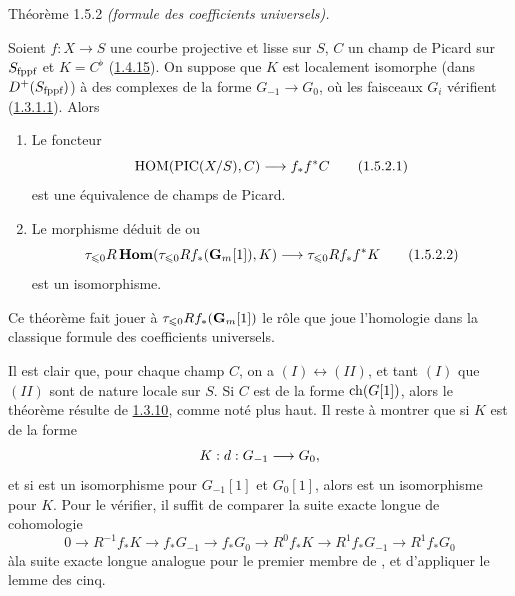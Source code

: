 \documentclass[10pt]{../fichiers-configuration-latex/smfart}
\begin{document}
\begin{enonce*}{Théorème 1.5.2}
\emph{(formule des coefficients universels).}

Soient $f:X\rightarrow S$ une courbe projective et lisse sur $S$, $C$
un champ de Picard sur $S_{\text{\rm fppf}}$ et $K=C^{\flat}$
(\hyperref[XVIII.prop1.4.15]{1.4.15}). On suppose que $K$ est localement isomorphe (dans
$D^{+}(S_{\text{\rm fppf}})$) à des complexes de la forme
$G_{-1}\rightarrow G_{0}$, où les faisceaux $G_{i}$ vérifient
(\hyperref[XVIII.par1.3.1.1]{1.3.1.1}). Alors
\begin{enumerate}
\renewcommand{\theenumi}{\Roman{enumi}}
\renewcommand{\labelenumi}{(\theenumi)}
\item Le foncteur 
\begin{equation*}
\operatorname{HOM}(\operatorname{PIC}(X/S),C)\longrightarrow f_{\ast}f^{\ast}C\tag{1.5.2.1}
\end{equation*}%
est une équivalence de champs de Picard.

\item Le morphisme déduit de  ou 
\begin{equation*}
\tau_{\leqslant 0}R\operatorname{\mathbf{Hom}}(\tau_{\leqslant 0}
Rf_{\ast}(\mathbf{G}_{m}[1]),K)\longrightarrow \tau_{\leqslant 0}
Rf_{\ast}f^{\ast}K\tag{1.5.2.2}
\end{equation*}%
est un isomorphisme.
\end{enumerate}
\end{enonce*}

Ce théorème fait jouer à $\tau_{\leqslant 0}Rf_{\ast}(\mathbf{G}_{m}[1])$
le rôle que joue l'homologie dans la classique formule des
coefficients universels.

Il est clair que, pour chaque champ $C$, on a $(I)\leftrightarrow
(II)$, et tant $(I)$ que $(II)$ sont de nature locale sur $S$. Si $C$
est de la forme $\operatorname{ch}(G[1])$, alors le théorème résulte de
\hyperref[XVIII.thm1.3.10]{1.3.10}, 
comme noté plus haut. Il reste à montrer que si $K$ est de la forme
$$
K:d:G_{-1}\longrightarrow G_{0}{},
$$
et si  est un isomorphisme pour $G_{-1}[1]$ et $G_{0}[1]$,
alors  est un isomorphisme pour $K$. Pour le vérifier, il
suffit de comparer la suite exacte longue de cohomologie
$$
0\longrightarrow R^{-1}f_{\ast}K\longrightarrow
f_{\ast}G_{-1}\longrightarrow f_{\ast}G_{0}\longrightarrow
R^{0}f_{\ast}K\longrightarrow R^{1} f_{\ast}G_{-1}\longrightarrow
R^{1}f_{\ast}G_{0}
$$
à\pageoriginale la suite exacte longue analogue pour le premier membre
de , et d'appliquer le lemme des cinq.
\end{document}
